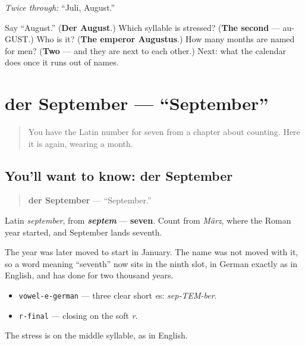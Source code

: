 \emph{Twice through:} \textquotedblleft{}Juli, August.\textquotedblright{}

\begin{tcolorbox}[breakable,colback=teal!4,colframe=teal!35!black,title={Before you move on}]
Say \textquotedblleft{}August.\textquotedblright{} (\textbf{Der August}.) Which syllable is stressed? (\textbf{The second} — au-GUST.) Who is it? (\textbf{The emperor Augustus}.) How many months are named for men? (\textbf{Two} — and they are next to each other.) Next: what the calendar does once it runs out of names.
\end{tcolorbox}
\section[der September]{der September — \textquotedblleft{}September\textquotedblright{}}

\label{lesson:GE-C09-september}



\begin{quote}
You have the Latin number for seven from a chapter about counting. Here it is again, wearing a month.
\end{quote}

\subsection*{You'll want to know: der September}
\begin{quote}
\textbf{der September} — \textquotedblleft{}September.\textquotedblright{}
\end{quote}

Latin \emph{september}, from \emph{\textbf{septem}} — \textbf{seven}. Count from \emph{März}, where the Roman year started, and September lands seventh.

The year was later moved to start in January. The name was not moved with it, so a word meaning \textquotedblleft{}seventh\textquotedblright{} now sits in the ninth slot, in German exactly as in English, and has done for two thousand years.

\begin{sounds}
\begin{itemize}
\raggedright
  \item \texttt{vowel-e-german} — three clear short \emph{e}s: \emph{sep-TEM-ber}.
  \item \texttt{r-final} — closing on the soft \emph{r}.
\end{itemize}

The stress is on the middle syllable, as in English.
\end{sounds}

